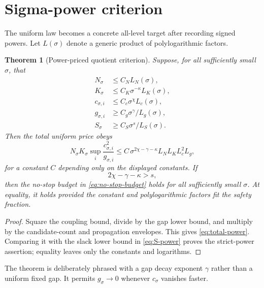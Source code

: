 \documentclass[11pt]{article}
\newtheorem{theorem}{Theorem}[section]
\theoremstyle{definition}
\theoremstyle{remark}
\begin{document}
\section{Sigma-power criterion}
\label{sec:powers}

The uniform law becomes a concrete all-level target after recording signed
powers.  Let $L(\sigma)$ denote a generic product of polylogarithmic factors.

\begin{theorem}[Power-priced quotient criterion]
 \label{thm:power}
 Suppose, for all sufficiently small $\sigma$, that
 \begin{align}
 N_\sigma&\le C_N L_N(\sigma),
 \label{eq:N-power}\\
 K_\sigma&\le C_K\sigma^{-\kappa}L_K(\sigma),
 \label{eq:K-power}\\
 c_{\sigma,i}&\le C_c\sigma^\chi L_c(\sigma),
 \label{eq:c-power}\\
 g_{\sigma,i}&\ge C_g\sigma^\gamma/L_g(\sigma),
 \label{eq:g-power}\\
 S_\sigma&\ge C_S\sigma^s/L_S(\sigma).
 \label{eq:S-power}
 \end{align}
 Then the total uniform price obeys
 \begin{equation}
 N_\sigma K_\sigma\sup_i\frac{c_{\sigma,i}^2}{g_{\sigma,i}}
 \le C\,\sigma^{2\chi-\gamma-\kappa}
 L_NL_KL_c^2L_g,
 \label{eq:total-power}
 \end{equation}
 for a constant $C$ depending only on the displayed constants.  If
 \begin{equation}
 2\chi-\gamma-\kappa>s,
 \label{eq:strict-power}
\end{equation}
 then the no-stop budget in \eqref{eq:no-stop-budget} holds for all
 sufficiently small $\sigma$.  At equality, it holds provided the constant
 and polylogarithmic factors fit the safety fraction.
\end{theorem}

\begin{proof}
 Square the coupling bound, divide by the gap lower bound, and multiply by
 the candidate-count and propagation envelopes.  This gives
 \eqref{eq:total-power}.  Comparing it with the slack lower bound in
 \eqref{eq:S-power} proves the strict-power assertion; equality leaves only
 the constants and logarithms.
\end{proof}

The theorem is deliberately phrased with a gap decay exponent $\gamma$ rather
than a uniform fixed gap.  It permits $g_\sigma\to0$ whenever $c_\sigma$
vanishes faster.
\end{document}

